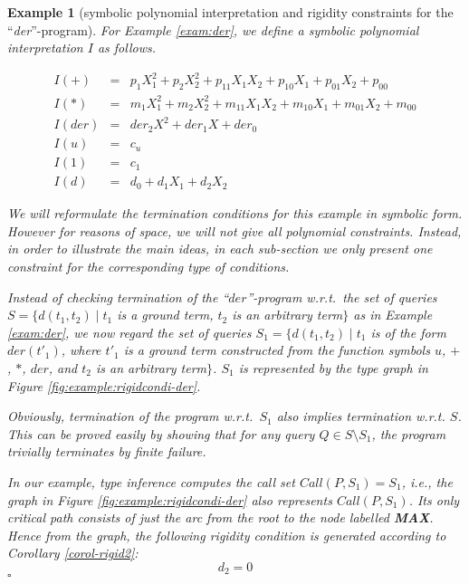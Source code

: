 \documentclass[envcountsame]{tlp}
\newcounter{ex:der-lastsymconsctr}
\newtheorem{example}{Example}
\begin{document}
\begin{example}[symbolic polynomial interpretation and 
rigidity constraints for the ``\textit{der}''-program]
\label{der:symbolrigidcond}
For Example \ref{exam:der},
we define a symbolic polynomial interpretation $I$ as 
follows.





\[\begin{array}{rcl}
I(+) &= &p_1 X_1^2+p_2 X_2^2+p_{11} X_1X_2+p_{10} X_1+p_{01} X_2+p_{00} \\ 
I(*) &= &m_1 X_1^2+m_2 X_2^2+m_{11} X_1X_2+m_{10} X_1+m_{01} X_2+m_{00} \\
I(\mathit{der}) &=&\mathit{der}_2 X^2+\mathit{der}_1 X+\mathit{der}_0 \\
I(u) &=& c_u \\
I(1) &=&c_{1} \\
I(d) &=&d_0 + d_1 X_1 + d_2 X_2
\end{array}\]


We will reformulate the termination conditions for this example in symbolic form. However
for reasons of space, we
will not give all polynomial constraints. Instead, in order to illustrate the main
ideas, in each sub-section we only present one constraint for the corresponding type of
conditions. 

Instead of checking termination of the ``$\mathit{der}$''-program w.r.t.\
the set of queries $S = \{d(t_1,t_2) \mid t_1$ is a ground term, $t_2$ is an
arbitrary term$\}$  
as in Example \ref{exam:der}, we now regard the set of queries $S_1 =
\{d(t_1,t_2) \mid t_1$ is of the form $der(t'_1)$,  
where $t'_1$ is a ground term constructed from the function symbols $u$, $+$, $*$,
$\mathit{der}$, and $t_2$ is an arbitrary term$ \}$. $S_1$ is represented by the type graph in
Figure \ref{fig:example:rigidcondi-der}. 

Obviously, termination of
the program w.r.t.\ $S_1$ also implies termination w.r.t. $S$. 
This can be proved easily by showing
		that for any query $Q \in S \setminus S_1$, the program trivially 
terminates by finite failure. 


In our example,
type inference \cite{Janssensetal92} computes the call set $\mathit{Call}(P,S_1)= S_1$,
i.e., the graph in Figure \ref{fig:example:rigidcondi-der} also represents
$\mathit{Call}(P,S_1)$. Its only critical path consists of just the arc from the root to the
node labelled \textbf{MAX}. Hence from 
the graph, the following rigidity
condition is generated according to Corollary \ref{corol-rigid2}: 
               \[d_2 = 0 \]
\hfill{$\square$}
\end{example}
\end{document}

